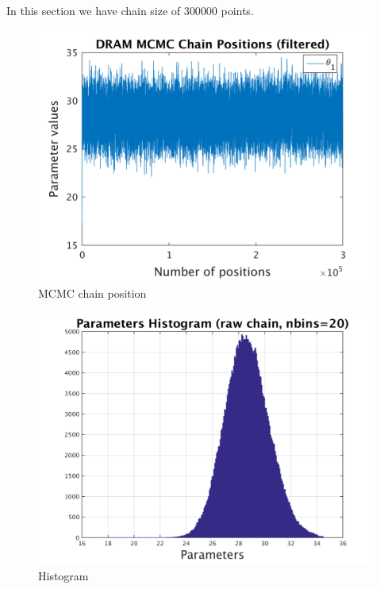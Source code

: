 In this section we have chain size of 300000 points. 

\begin{figure}[H]
  
  \centering
   \includegraphics[scale=0.75]{53_results/output_300000/simple_ip_chain_pos_filt}
   \caption{MCMC chain position }
\end{figure}


\begin{figure}[H]
  
  \centering
   \includegraphics[scale=0.75]{53_results/output_300000/simple_ip_hist_raw}
   \caption{Histogram}
\end{figure}

\clearpage

